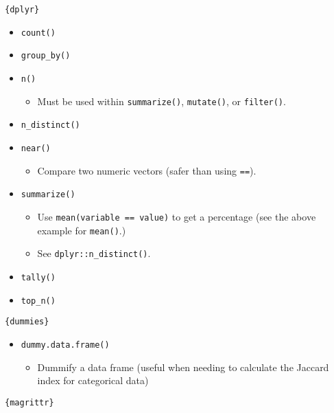 \documentclass[
]{book}
\providecommand{\tightlist}{%
  \setlength{\itemsep}{0pt}\setlength{\parskip}{0pt}}
\begin{document}
\texttt{\{dplyr\}}

\begin{itemize}
\tightlist
\item
  \texttt{count()}
\item
  \texttt{group\_by()}
\item
  \texttt{n()}

  \begin{itemize}
  \tightlist
  \item
    Must be used within \texttt{summarize()}, \texttt{mutate()}, or \texttt{filter()}.
  \end{itemize}
\item
  \texttt{n\_distinct()}
\item
  \texttt{near()}

  \begin{itemize}
  \tightlist
  \item
    Compare two numeric vectors (safer than using \texttt{==}).
  \end{itemize}
\item
  \texttt{summarize()}

  \begin{itemize}
  \tightlist
  \item
    Use \texttt{mean(variable\ ==\ value)} to get a percentage (see the above example for \texttt{mean()}.)
  \item
    See \texttt{dplyr::n\_distinct()}.
  \end{itemize}
\item
  \texttt{tally()}
\item
  \texttt{top\_n()}
\end{itemize}

\texttt{\{dummies\}}

\begin{itemize}
\tightlist
\item
  \texttt{dummy.data.frame()}

  \begin{itemize}
  \tightlist
  \item
    Dummify a data frame (useful when needing to calculate the Jaccard index for categorical data)
  \end{itemize}
\end{itemize}

\texttt{\{magrittr\}}
\end{document}
